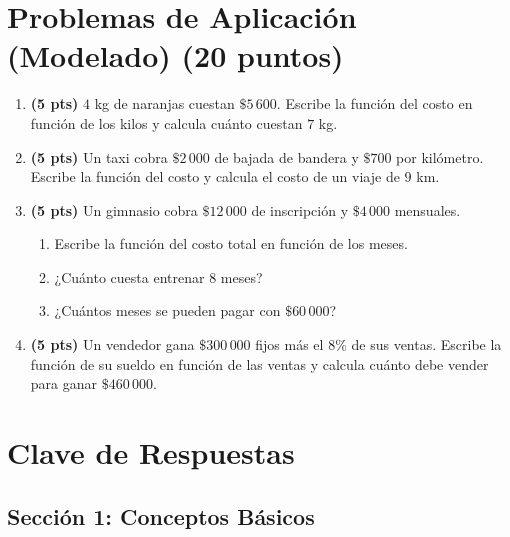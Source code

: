 \documentclass[12pt, letterpaper]{article}
\begin{document}
\newpage

\section{Problemas de Aplicación (Modelado) (20 puntos)}

\begin{enumerate}[leftmargin=*]
  \item \textbf{(5 pts)} $4$ kg de naranjas cuestan $\$5\,600$. Escribe la función del costo en función de los kilos y calcula cuánto cuestan $7$ kg.

  \item \textbf{(5 pts)} Un taxi cobra $\$2\,000$ de bajada de bandera y $\$700$ por kilómetro. Escribe la función del costo y calcula el costo de un viaje de $9$ km.

  \item \textbf{(5 pts)} Un gimnasio cobra $\$12\,000$ de inscripción y $\$4\,000$ mensuales.
        \begin{enumerate}[label=\alph*)]
          \item Escribe la función del costo total en función de los meses.
          \item ¿Cuánto cuesta entrenar $8$ meses?
          \item ¿Cuántos meses se pueden pagar con $\$60\,000$?
        \end{enumerate}

  \item \textbf{(5 pts)} Un vendedor gana $\$300\,000$ fijos más el $8\%$ de sus ventas. Escribe la función de su sueldo en función de las ventas y calcula cuánto debe vender para ganar $\$460\,000$.
\end{enumerate}

\newpage

\ifmwclaves
  \section{Clave de Respuestas}

  \subsection*{Sección 1: Conceptos Básicos}
\end{document}
